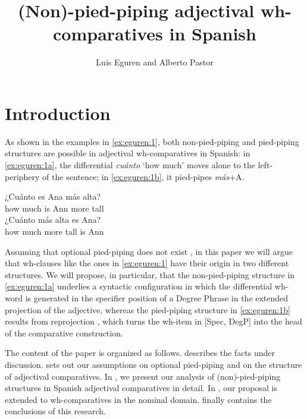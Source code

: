 \documentclass[output=paper,colorlinks,citecolor=brown]{langscibook}
\author{Luis Eguren\affiliation{Universidad Autónoma de Madrid} and Alberto Pastor\affiliation{Southern Methodist University}}
\title{(Non)-pied-piping adjectival wh-comparatives in Spanish}
\begin{document}
\maketitle

\section{Introduction}
\label{sec:eguren:1}

As shown in the examples in \ref{ex:eguren:1}, both non-pied-piping and pied-piping structures are possible in adjectival wh-comparatives in Spanish: in \ref{ex:eguren:1a}, the differential \textit{cuánto} `how much' moves alone to the left-periphery of the sentence; in \ref{ex:eguren:1b}, it pied-pipes \textit{más}+A.

\begin{exe} %
    \ex\label{ex:eguren:1} %
    \begin{xlist} %
        \ex \label{ex:eguren:1a}
            \gll   ¿Cuánto	es	Ana	más	alta?\\   %
                   {how much}	is	Ann	more	tall\\    %
        \ex\label{ex:eguren:1b}
            \gll   ¿Cuánto	más	alta	es	Ana?\\
                   {how much}	more	tall	is	Ann\\
\end{xlist}
\end{exe}

Assuming that optional pied-piping does not exist \citep{heck2008pied,heck2009certain}, in this paper we will argue that wh-clauses like the ones in \ref{ex:eguren:1} have their origin in two different structures. We will propose, in particular, that the non-pied-piping structure in \ref{ex:eguren:1a} underlies a syntactic configuration in which the differential wh-word is generated in the specifier position of a Degree Phrase in the extended projection of the adjective, whereas the pied-piping structure in \ref{ex:eguren:1b} results from reprojection \citep{hornstein2002reprojections}, which turns the wh-item in [Spec, DegP] into the head of the comparative construction.

The content of the paper is organized as follows.  describes the facts under discussion.  sets out our assumptions on optional pied-piping and on the structure of adjectival comparatives. In , we present our analysis of (non)-pied-piping structures in Spanish adjectival comparatives in detail. In , our proposal is extended to wh-comparatives in the nominal domain.  finally contains the conclusions of this research.
\end{document}
